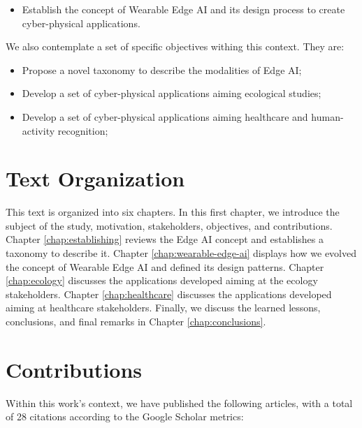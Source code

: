 \begin{itemize}
    \item Establish the concept of Wearable Edge AI and its design process to create cyber-physical applications.
\end{itemize}

We also contemplate a set of specific objectives withing this context. They are:

\begin{itemize}
    \item Propose a novel taxonomy to describe the modalities of Edge AI; 
    \item Develop a set of cyber-physical applications aiming ecological studies;
    \item Develop a set of cyber-physical applications aiming healthcare and human-activity recognition; 
\end{itemize}

\section{Text Organization}

This text is organized into six chapters. In this first chapter, we introduce the subject of the study, motivation, stakeholders, objectives, and contributions. Chapter \ref{chap:establishing} reviews the Edge AI concept and establishes a taxonomy to describe it. Chapter \ref{chap:wearable-edge-ai} displays how we evolved the concept of Wearable Edge AI and defined its design patterns. Chapter \ref{chap:ecology} discusses the applications developed aiming at the ecology stakeholders. Chapter \ref{chap:healthcare} discusses the applications developed aiming at healthcare stakeholders. Finally, we discuss the learned lessons, conclusions, and final remarks in Chapter \ref{chap:conclusions}. 

\section{Contributions}

Within this work's context, we have published the following articles, with a total of 28 citations according to the Google Scholar metrics:

